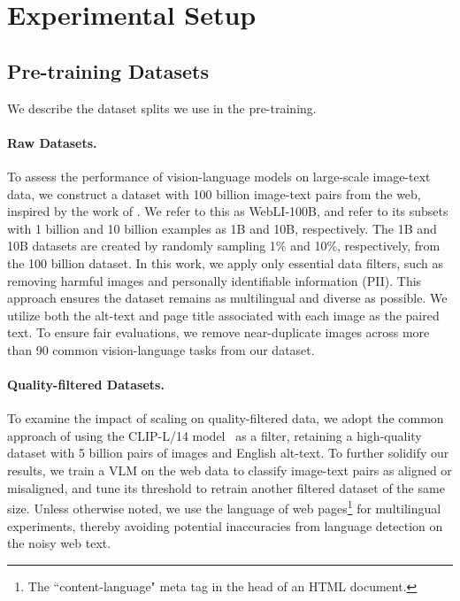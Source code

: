 %



\section{Experimental Setup}

\subsection{Pre-training Datasets}
We describe the dataset splits we use in the pre-training.

\paragraph{Raw Datasets.}To assess the performance of vision-language models on large-scale image-text data, we construct a dataset with 100 billion image-text pairs from the web, inspired by the work of \citet{chen2022pali,schuhmann2022laion,zhai2022lit,jia2021scaling}. We refer to this as WebLI-100B, and refer to its subsets with 1 billion and 10 billion examples as 1B and 10B, respectively.  The 1B and 10B datasets are created by randomly sampling 1\% and 10\%, respectively, from the 100 billion dataset. In this work, we apply only essential data filters, such as removing harmful images and personally identifiable information (PII). This approach ensures the dataset remains as multilingual and diverse as possible. We utilize both the alt-text and page title associated with each image as the paired text. To ensure fair evaluations, we remove near-duplicate images across more than 90 common vision-language tasks from our dataset.

\paragraph{Quality-filtered Datasets.}To examine the impact of scaling on quality-filtered data, we adopt the common approach of using the CLIP-L/14 model~\citep{radford2021learning} as a filter, retaining a high-quality dataset with 5 billion pairs of images and English alt-text. To further solidify our results, we train a VLM on the web data to classify image-text pairs as aligned or misaligned, and tune its threshold to retrain another filtered dataset of the same size. Unless otherwise noted, we use the language of web pages\footnote{The ``content-language" meta tag in the head of an HTML document.} for multilingual experiments, thereby avoiding potential inaccuracies from language detection on the noisy web text.

